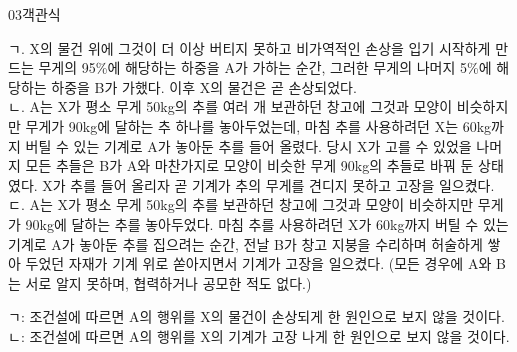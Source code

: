 \documentclass[fs85,seriesWit]{korfarm-base}
\begin{document}
\begin{kfQBlock}{03}{객관식}
\begin{kfEvidence}ㄱ. X의 물건 위에 그것이 더 이상 버티지 못하고 비가역적인 손상을 입기 시작하게 만드는 무게의 95\%에 해당하는 하중을 A가 가하는 순간, 그러한 무게의 나머지 5\%에 해당하는 하중을 B가 가했다. 이후 X의 물건은 곧 손상되었다. \\\relax
ㄴ. A는 X가 평소 무게 50kg의 추를 여러 개 보관하던 창고에 그것과 모양이 비슷하지만 무게가 90kg에 달하는 추 하나를 놓아두었는데, 마침 추를 사용하려던 X는 60kg까지 버틸 수 있는 기계로 A가 놓아둔 추를 들어 올렸다. 당시 X가 고를 수 있었을 나머지 모든 추들은 B가 A와 마찬가지로 모양이 비슷한 무게 90kg의 추들로 바꿔 둔 상태였다. X가 추를 들어 올리자 곧 기계가 추의 무게를 견디지 못하고 고장을 일으켰다. \\\relax
ㄷ. A는 X가 평소 무게 50kg의 추를 보관하던 창고에 그것과 모양이 비슷하지만 무게가 90kg에 달하는 추를 놓아두었다. 마침 추를 사용하려던 X가 60kg까지 버틸 수 있는 기계로 A가 놓아둔 추를 집으려는 순간, 전날 B가 창고 지붕을 수리하며 허술하게 쌓아 두었던 자재가 기계 위로 쏟아지면서 기계가 고장을 일으켰다. (모든 경우에 A와 B는 서로 알지 못하며, 협력하거나 공모한 적도 없다.)\end{kfEvidence}
\begin{kfChoices}
\kfChoice ㄱ: 조건설에 따르면 A의 행위를 X의 물건이 손상되게 한 원인으로 보지 않을 것이다.
\kfChoice ㄴ: 조건설에 따르면 A의 행위를 X의 기계가 고장 나게 한 원인으로 보지 않을 것이다.
\end{kfChoices}
\end{kfQBlock}
\end{document}
